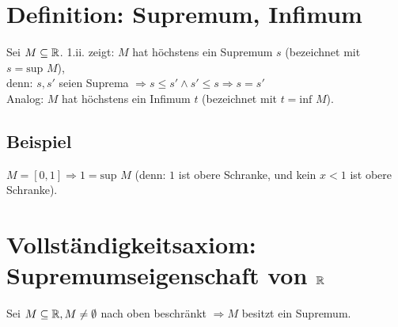 \fancyhead[R]{}
\section{Definition: Supremum, Infimum}\label{3.10}
Sei $M \subseteq \mathbb{R}$.
1.ii. zeigt: $M$ hat höchstens ein Supremum $s$ (bezeichnet mit $s = \text{sup } M$),\\
denn: $s, s'$ seien Suprema $\Rightarrow s \le s' \wedge s' \le s \Rightarrow s=s'$\\
Analog: $M$ hat höchstens ein Infimum $t$ (bezeichnet mit $t = \text{inf } M$).

\subsection*{Beispiel}
$M = [0,1] \Rightarrow 1 = \text{sup } M$ (denn: $1$ ist obere Schranke, und kein $x<1$ ist obere Schranke).

\section{\texorpdfstring{Vollständigkeitsaxiom: Supremumseigenschaft von $\mathbb{R}$}{Vollständigkeitsaxiom: Supremumseigenschaft von \R}}\label{3.11}
Sei $M \subseteq \mathbb{R}, M \neq \emptyset$ nach oben beschränkt $\Rightarrow M$ besitzt ein Supremum.

